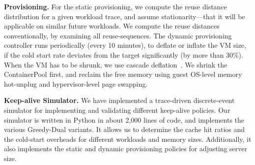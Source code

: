 


\noindent \textbf{Provisioning.}
For the static provisioning, we compute the reuse distance distribution for a given workload trace, and assume stationarity---that it will be applicable on similar future workloads. 
We compute the reuse distances conventionally, by examining all reuse-sequences.
The dynamic provisioning controller runs periodically (every 10 minutes), to deflate or inflate the VM size, if the cold start rate deviates from the target significantly (by more than 30\%).
When the VM has to be shrunk, we use cascade deflation~\cite{deflation-eurosys19}.
We shrink the ContainerPool first, and reclaim the free memory using guest OS-level memory hot-unplug and hypervisor-level page swapping. 



\noindent \textbf{Keep-alive Simulator.}
We have implemented a trace-driven discrete-event simulator for implementing and validating different keep-alive policies.
Our simulator is written in Python in about 2,000 lines of code, and implements the various Greedy-Dual variants. 
It allows us to determine the cache hit ratios and the cold-start overheads for different workloads and memory sizes.
Additionally, it also implements the static and dynamic provisioning policies for adjusting server size.

